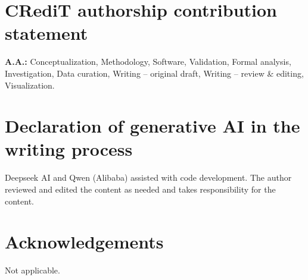 \documentclass[3p,11pt]{elsarticle}
\begin{document}
\section*{CRediT authorship contribution statement}
\textbf{A.A.:} Conceptualization, Methodology, Software, Validation,
Formal analysis, Investigation, Data curation, Writing -- original draft,
Writing -- review \& editing, Visualization.

\section*{Declaration of generative AI in the writing process}
Deepseek AI and Qwen (Alibaba) assisted with code development. The author
reviewed and edited the content as needed and takes responsibility for the
content.

\section*{Acknowledgements}
Not applicable.
\end{document}

